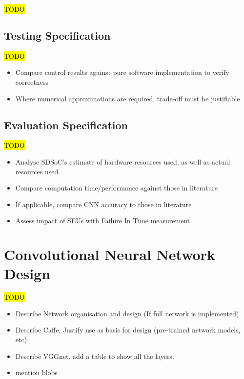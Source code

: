 \documentclass[12pt]{article}
\begin{document}
\hl{TODO}

\subsection{Testing Specification}
\label{sec:ProjSpec-TestSpec}

\hl{TODO}

\begin{itemize}
\item Compare control results against pure software implementation to verify correctness
\item Where numerical approximations are required, trade-off must be justifiable
\end{itemize}

\subsection{Evaluation Specification}
\label{sec:ProjSpec-EvalSpec}

\hl{TODO}

\begin{itemize}
\item Analyse SDSoC's estimate of hardware resources used, as well as actual resources used.
\item Compare computation time/performance against those in literature
\item If applicable, compare CNN accuracy to those in literature
\item Assess impact of SEUs with Failure In Time measurement
\end{itemize}

\newpage

\section{Convolutional Neural Network Design}
\label{sec:Design-Network}

\hl{TODO}

\begin{itemize}
\item Describe Network organisation and design (If full network is implemented)
\item Describe Caffe, Justify use as basis for design (pre-trained network models, etc)
\item Describe VGGnet, add a table to show all the layers.
\item mention blobs
\end{itemize}
\end{document}
